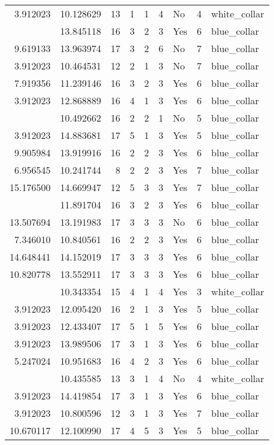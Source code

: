 \documentclass[
]{article}
\begin{document}
\begin{longtable}[t]{rrrrrllrl}
3.912023 & 10.128629 & 13 & 1 & 1 & 4 & No & 4 & white\_collar\\
\addlinespace
12.206323 & 13.845118 & 16 & 3 & 2 & 3 & Yes & 6 & blue\_collar\\
9.619133 & 13.963974 & 17 & 3 & 2 & 6 & No & 7 & blue\_collar\\
3.912023 & 10.464531 & 12 & 2 & 1 & 3 & No & 7 & blue\_collar\\
7.919356 & 11.239146 & 16 & 3 & 2 & 3 & Yes & 6 & blue\_collar\\
3.912023 & 12.868889 & 16 & 4 & 1 & 3 & Yes & 6 & blue\_collar\\
\addlinespace
10.128629 & 10.492662 & 16 & 2 & 2 & 1 & No & 5 & blue\_collar\\
3.912023 & 14.883681 & 17 & 5 & 1 & 3 & Yes & 5 & blue\_collar\\
9.905984 & 13.919916 & 16 & 2 & 2 & 3 & Yes & 6 & blue\_collar\\
6.956545 & 10.241744 & 8 & 2 & 2 & 3 & Yes & 7 & blue\_collar\\
15.176500 & 14.669947 & 12 & 5 & 3 & 3 & Yes & 7 & blue\_collar\\
\addlinespace
8.086410 & 11.891704 & 16 & 3 & 2 & 3 & Yes & 6 & blue\_collar\\
13.507694 & 13.191983 & 17 & 3 & 3 & 3 & No & 6 & blue\_collar\\
7.346010 & 10.840561 & 16 & 2 & 2 & 3 & Yes & 6 & blue\_collar\\
14.648441 & 14.152019 & 17 & 3 & 3 & 3 & Yes & 6 & blue\_collar\\
10.820778 & 13.552911 & 17 & 3 & 3 & 3 & Yes & 6 & blue\_collar\\
\addlinespace
3.912023 & 10.343354 & 15 & 4 & 1 & 4 & Yes & 3 & white\_collar\\
3.912023 & 12.095420 & 16 & 2 & 1 & 3 & Yes & 5 & blue\_collar\\
3.912023 & 12.433407 & 17 & 5 & 1 & 5 & Yes & 6 & blue\_collar\\
3.912023 & 13.989506 & 17 & 3 & 1 & 3 & Yes & 6 & blue\_collar\\
5.247024 & 10.951683 & 16 & 4 & 2 & 3 & Yes & 6 & blue\_collar\\
\addlinespace
3.912023 & 10.435585 & 13 & 3 & 1 & 4 & No & 4 & white\_collar\\
3.912023 & 14.419854 & 17 & 3 & 1 & 3 & Yes & 6 & blue\_collar\\
3.912023 & 10.800596 & 12 & 3 & 1 & 3 & Yes & 7 & blue\_collar\\
10.670117 & 12.100990 & 17 & 4 & 5 & 3 & Yes & 5 & blue\_collar\\

\end{longtable}
\end{document}
